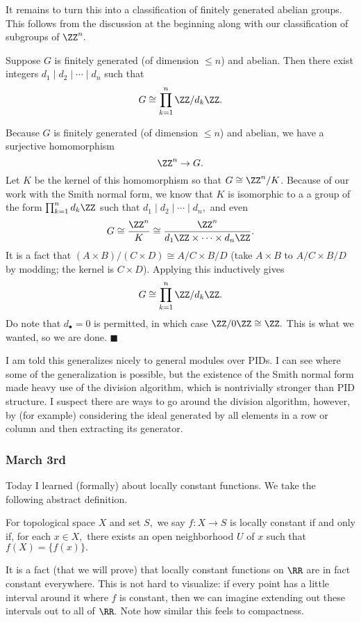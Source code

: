 It remains to turn this into a classification of finitely generated abelian groups. This follows from the discussion at the beginning along with our classification of subgroups of $\ZZ^n.$
\begin{theorem}
    Suppose $G$ is finitely generated (of dimension $\le n$) and abelian. Then there exist integers $d_1\mid d_2\mid\cdots\mid d_n$ such that
    \[G\cong\prod_{k=1}^n\ZZ/d_k\ZZ.\]
\end{theorem}
Because $G$ is finitely generated (of dimension $\le n$) and abelian, we have a surjective homomorphism
\[\ZZ^n\to G.\]
Let $K$ be the kernel of this homomorphism so that $G\cong\ZZ^n/K$. Because of our work with the Smith normal form, we know that $K$ is isomorphic to a a group of the form $\prod_{k=1}^nd_k\ZZ$ such that $d_1\mid d_2\mid\cdots\mid d_n,$ and even
\[G\cong\frac{\ZZ^n}K\cong\frac{\ZZ^n}{d_1\ZZ\times\cdots\times d_n\ZZ}.\]
It is a fact that $(A\times B)/(C\times D)\cong A/C\times B/D$ (take $A\times B$ to $A/C\times B/D$ by modding; the kernel is $C\times D$). Applying this inductively gives
\[G\cong\prod_{k=1}^n\ZZ/d_k\ZZ.\]
Do note that $d_\bullet=0$ is permitted, in which case $\ZZ/0\ZZ\cong\ZZ.$ This is what we wanted, so we are done. $\blacksquare$

I am told this generalizes nicely to general modules over PIDs. I can see where some of the generalization is possible, but the existence of the Smith normal form made heavy use of the division algorithm, which is nontrivially stronger than PID structure. I suspect there are ways to go around the division algorithm, however, by (for example) considering the ideal generated by all elements in a row or column and then extracting its generator.

\subsubsection{March 3rd}
Today I learned (formally) about locally constant functions. We take the following abstract definition.
\begin{definition}
    For topological space $X$ and set $S,$ we say $f:X\to S$ is locally constant if and only if, for each $x\in X,$ there exists an open neighborhood $U$ of $x$ such that $f(X)=\{f(x)\}.$
\end{definition}
It is a fact (that we will prove) that locally constant functions on $\RR$ are in fact constant everywhere. This is not hard to visualize: if every point has a little interval around it where $f$ is constant, then we can imagine extending out these intervals out to all of $\RR.$ Note how similar this feels to compactness.

